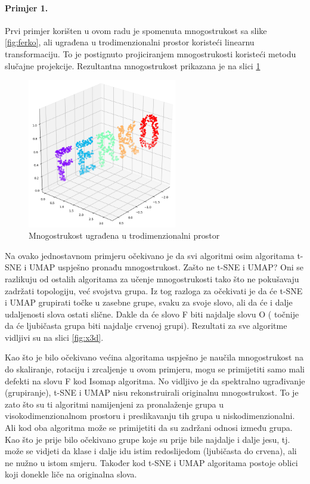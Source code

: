 \documentclass[times, utf8, diplomski]{fer}
\begin{document}
\paragraph{Primjer 1.}
Prvi primjer korišten u ovom radu je spomenuta mnogostrukost sa slike \ref{fig:ferko}, ali ugrađena u trodimenzionalni prostor koristeći linearnu transformaciju. To je postignuto projiciranjem mnogostrukosti koristeći metodu slučajne projekcije. Rezultantna mnogostrukost prikazana je na slici \ref{fig:ferko3d}

\begin{figure}[htb]
    \centering
    \includegraphics[width=6.5cm]{resources/images/reduction/compare/ferko3d.png}
    \caption{Mnogostrukost ugrađena u trodimenzionalni prostor}
    \label{fig:ferko3d}
\end{figure}

Na ovako jednostavnom primjeru očekivano je da svi algoritmi osim algoritama t-SNE i UMAP uspješno pronađu mnogostrukost. Zašto ne t-SNE i UMAP? Oni se razlikuju od ostalih algoritama za učenje mnogostrukosti tako što ne pokušavaju zadržati topologiju, već svojstva grupa. Iz tog razloga za očekivati je da će t-SNE i UMAP grupirati točke u zasebne grupe, svaku za svoje slovo, ali da će i dalje udaljenosti slova ostati slične. Dakle da će slovo F biti najdalje slovu O ( točnije da će ljubičasta grupa biti najdalje crvenoj grupi). Rezultati za sve algoritme vidljivi su na slici \ref{fig:x3d}.

Kao što je bilo očekivano većina algoritama uspješno je naučila mnogostrukost na do skaliranje, rotaciju i zrcaljenje u ovom primjeru, mogu se primijetiti samo mali defekti na slovu F kod Isomap algoritma. No vidljivo je da spektralno ugrađivanje (grupiranje), t-SNE i UMAP nisu rekonstruirali originalnu mnogostrukost. To je zato što su ti algoritmi namijenjeni za pronalaženje grupa u visokodimenzionalnom prostoru i preslikavanju tih grupa u niskodimenzionalni. Ali kod oba algoritma može se primijetiti da su zadržani odnosi između grupa. Kao što je prije bilo očekivano grupe koje su prije bile najdalje i dalje jesu, tj. može se vidjeti da klase i dalje idu istim redoslijedom (ljubičasta do crvena), ali ne nužno u istom smjeru. Također kod t-SNE i UMAP algoritama postoje oblici koji donekle liče na originalna slova.
\end{document}
